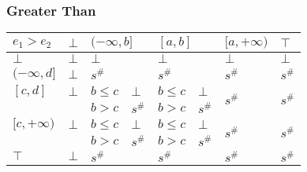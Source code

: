 \documentclass{beamer}
\begin{document}
        \begin{frame}
            \frametitle{Greater Than}
    \begin{table}[]
        \begin{tabular}{|l|l|ll|ll|l|l|}
        \hline
        $e_1 > e_2$    & $\bot$ & \multicolumn{2}{l|}{$(-\infty, b]$} & \multicolumn{2}{l|}{$[a, b]$} & $[a, +\infty)$          & $\top$                  \\ \hline
        $\bot$         & $\bot$ & \multicolumn{2}{l|}{$\bot$}         & \multicolumn{2}{l|}{$\bot$}   & $\bot$                  & $\bot$                  \\ \hline
        $(-\infty, d]$ & $\bot$ & \multicolumn{2}{l|}{$s^\#$}         & \multicolumn{2}{l|}{$s^\#$}   & $s^\#$                  & $s^\#$                  \\ \hline
        $[c, d]$       & $\bot$ & $b \le c$          & $\bot$         & $b \le c$       & $\bot$      & \multirow{2}{*}{$s^\#$} & \multirow{2}{*}{$s^\#$} \\
                        &        & $b > c$            & $s^\#$         & $b > c$         & $s^\#$      &                         &                         \\ \hline
        $[c, +\infty)$ & $\bot$ & $b \le c$          & $\bot$         & $b \le c$       & $\bot$      & \multirow{2}{*}{$s^\#$} & \multirow{2}{*}{$s^\#$} \\
                        &        & $b > c$            & $s^\#$         & $b > c$         & $s^\#$      &                         &                         \\ \hline
        $\top$         & $\bot$ & \multicolumn{2}{l|}{$s^\#$}         & \multicolumn{2}{l|}{$s^\#$}   & $s^\#$                  & $s^\#$                  \\ \hline
        \end{tabular}
        \end{table}
    \end{frame}
    
\end{document}

